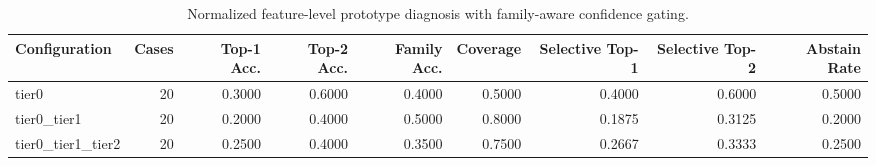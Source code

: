 \begin{table}[t]
\centering
\caption{Normalized feature-level prototype diagnosis with family-aware confidence gating.}
\label{tab:dice_stressor_hierarchical_diagnosis}
\footnotesize
\begin{tabular}{lrrrrrrrr}
\toprule
Configuration & Cases & Top-1 Acc. & Top-2 Acc. & Family Acc. & Coverage & Selective Top-1 & Selective Top-2 & Abstain Rate \\
\midrule
tier0 & 20 & 0.3000 & 0.6000 & 0.4000 & 0.5000 & 0.4000 & 0.6000 & 0.5000 \\
tier0_tier1 & 20 & 0.2000 & 0.4000 & 0.5000 & 0.8000 & 0.1875 & 0.3125 & 0.2000 \\
tier0_tier1_tier2 & 20 & 0.2500 & 0.4000 & 0.3500 & 0.7500 & 0.2667 & 0.3333 & 0.2500 \\
\bottomrule
\end{tabular}

\end{table}
